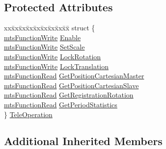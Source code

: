 \subsection*{Protected Attributes}
\begin{DoxyCompactItemize}
\item 
\begin{tabbing}
xx\=xx\=xx\=xx\=xx\=xx\=xx\=xx\=xx\=\kill
struct \{\\
\>\hyperlink{classmts_function_write}{mtsFunctionWrite} \hyperlink{classmts_tele_operation_qt_widget_ac031ba3e7dbdfba30b1f259a5109b7a7}{Enable}\\
\>\hyperlink{classmts_function_write}{mtsFunctionWrite} \hyperlink{classmts_tele_operation_qt_widget_ac2898212c3092185dd4a86dabfc8669e}{SetScale}\\
\>\hyperlink{classmts_function_write}{mtsFunctionWrite} \hyperlink{classmts_tele_operation_qt_widget_ae77fdb1d0b172b256107d5e7e9a494a2}{LockRotation}\\
\>\hyperlink{classmts_function_write}{mtsFunctionWrite} \hyperlink{classmts_tele_operation_qt_widget_ac161b52e1501409096e648358cf70654}{LockTranslation}\\
\>\hyperlink{classmts_function_read}{mtsFunctionRead} \hyperlink{classmts_tele_operation_qt_widget_a9ffb4a1017237ee19a112b598698fa64}{GetPositionCartesianMaster}\\
\>\hyperlink{classmts_function_read}{mtsFunctionRead} \hyperlink{classmts_tele_operation_qt_widget_a79f316cb32e00b6562055802ebe7303c}{GetPositionCartesianSlave}\\
\>\hyperlink{classmts_function_read}{mtsFunctionRead} \hyperlink{classmts_tele_operation_qt_widget_a304765452ec072593f21b09016ef74d2}{GetRegistrationRotation}\\
\>\hyperlink{classmts_function_read}{mtsFunctionRead} \hyperlink{classmts_tele_operation_qt_widget_a7ce8de289a4a1b48735de5ce6d278bc3}{GetPeriodStatistics}\\
\} \hyperlink{classmts_tele_operation_qt_widget_a59ab78038c4a0d93a296516fe7a5562f}{TeleOperation}\\

\end{tabbing}\end{DoxyCompactItemize}
\subsection*{Additional Inherited Members}


